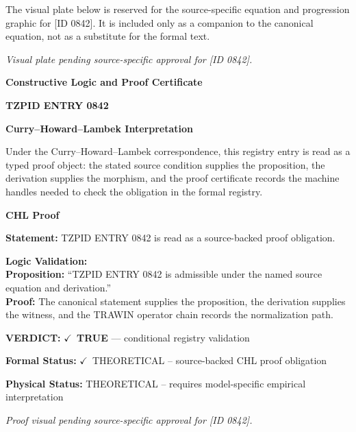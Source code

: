 \begingroup\footnotesize\sloppy
The visual plate below is reserved for the source-specific equation and progression graphic for [ID 0842]. It is included only as a companion to the canonical equation, not as a substitute for the formal text.
\par\endgroup
\begingroup\footnotesize\itshape
Visual plate pending source-specific approval for [ID 0842].
\par\endgroup

\clearpage
\begingroup\tzpsupportsetup
\noindent\textbf{\fontsize{10.8pt}{12.8pt}\selectfont [ID 0842] Constructive Logic and Proof Certificate}\par
\noindent\textbf{\fontsize{10pt}{12pt}\selectfont TZPID ENTRY 0842}\par
\vspace{0.45em}
\begingroup
\footnotesize
\setlength{\parskip}{0.22em}
\setlength{\parindent}{0pt}
\noindent\textbf{Curry--Howard--Lambek Interpretation}\par
Under the Curry--Howard--Lambek correspondence, this registry entry is read as a typed proof
object: the stated source condition supplies the proposition, the derivation supplies the
morphism, and the proof certificate records the machine handles needed to check the obligation
in the formal registry.

\vspace{0.45em}
\noindent\textbf{CHL Proof}\par
\textbf{Statement:} TZPID ENTRY 0842 is read as a source-backed proof obligation.

\textbf{Logic Validation:}\\
\textbf{Proposition:} ``TZPID ENTRY 0842 is admissible under the named source equation and derivation.''\\
\textbf{Proof:} The canonical statement supplies the proposition, the derivation supplies the witness, and the TRAWIN operator chain records the normalization path.

\textbf{VERDICT:} \ensuremath{\checkmark}\ \textbf{TRUE} --- conditional registry validation

\textbf{Formal Status:} \ensuremath{\checkmark}\ THEORETICAL -- source-backed CHL proof obligation

\textbf{Physical Status:} THEORETICAL -- requires model-specific empirical interpretation
\par\vspace{0.45em}
\par
\vfill
\begingroup\footnotesize\itshape
Proof visual pending source-specific approval for [ID 0842].
\par\endgroup
\vfill
\endgroup
\endgroup
